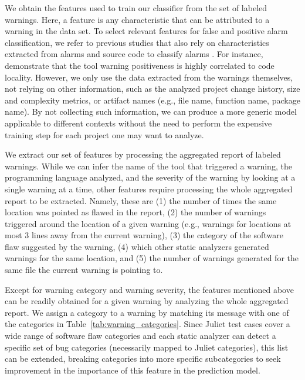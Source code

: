 We obtain the features used to train our classifier from the set of labeled
warnings. Here, a feature is any characteristic that can be attributed to a
warning in the data set. To select relevant features for false and positive
alarm classification, we refer to previous studies that also rely on
characteristics extracted from alarms and source code to classify alarms
\citep{ruthruff_predicting_2008, kremenek2004correlation, heckman2009model,
jung2005taming}. For instance, \cite{kremenek2004correlation}
demonstrate that the tool warning positiveness is highly correlated to code
locality.  However, we only use the data extracted from the warnings
themselves, not relying on other information, such as the analyzed project
change history, size and complexity metrics, or artifact names (e.g., file name,
function name, package name). By not collecting such information, we can
produce a more generic model applicable to different contexts without the
need to perform the expensive training step for each project one may want to
analyze.

We extract our set of features by processing the aggregated report of labeled
warnings.
While we can infer the name of the tool that triggered a warning, the programming
language analyzed, and the severity of the warning by looking
at a single warning at a time,
other features require processing the whole
aggregated report to be extracted. Namely, these are (1) the number of times the same
location was pointed as flawed in the report, (2) the number of warnings triggered
around the location of a given warning (e.g., warnings for locations at most 3
lines away from the current warning), (3) the category of the software flaw
suggested by the warning, (4) which other static analyzers generated warnings for
the same location, and (5) the number of warnings generated for the same file the
current warning is pointing to.

Except for warning category and warning severity, the features
mentioned above can be readily obtained for a given warning by analyzing the
whole aggregated report. We assign a category to a warning by matching its
message with one of the categories in Table~\ref{tab:warning_categories}. Since
Juliet test cases cover a wide range of software flaw categories and each
static analyzer can detect a specific set of bug categories (necessarily mapped
to Juliet categories), this list can be extended, breaking categories into more
specific subcategories to seek improvement in the importance of this feature in
the prediction model.


